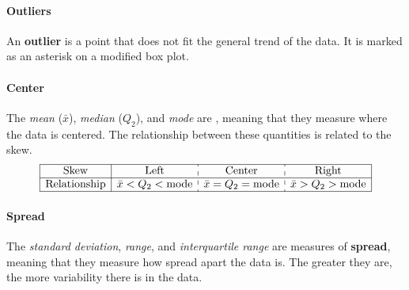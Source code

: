 \documentclass[../AP_Statistics.tex]{subfiles}
\begin{document}
				\paragraph{Outliers}
					An \textbf{outlier} is a point that does not fit the general trend of the data. It is marked as an asterisk on a modified box plot. \\
				\paragraph{Center}
					The \emph{mean} ($\bar{x}$), \emph{median} ($Q_2$), and \emph{mode} are , meaning that they measure where the data is centered. The relationship between these quantities is related to the skew.
					\[\begin{array}{|c|c:c:c|}\hline
						\rm{Skew} & \rm{Left} & \rm{Center} & \rm{Right} \\\hline
						\rm{Relationship} & \bar{x} < Q_2 < \rm{mode} & \bar{x} = Q_2 = \rm{mode} & \bar{x} > Q_2 > \rm{mode} \\\hline
					\end{array}\]
				\paragraph{Spread}
					The \emph{standard deviation}, \emph{range}, and \emph{interquartile range} are measures of \textbf{spread}, meaning that they measure how spread apart the data is. The greater they are, the more variability there is in the data.
\end{document}
